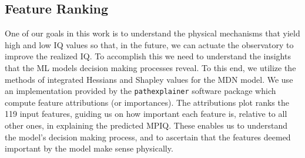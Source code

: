 \subsection{Feature Ranking}\label{sec:featureRank}

One of our goals in this work is to understand the physical mechanisms that yield high and low IQ values so that, in the future, we can actuate the observatory to improve the realized IQ.  To accomplish this we need to understand the insights that the ML models decision making processes reveal. To this end, we utilize the methods of integrated Hessians and Shapley values \citep{explaining_explanations_hessians, gilda_mirkwood, gilda_mirkwood_software} for the MDN model. %
We use an implementation provided by the \texttt{pathexplainer} software package which compute feature attributions (or importances). The attributions plot ranks the 119 input features, guiding us on how important each feature is, relative to all other ones, in explaining the predicted MPIQ. These enables us to understand the model's decision making process, and to ascertain that the features deemed important by the model make sense physically.
